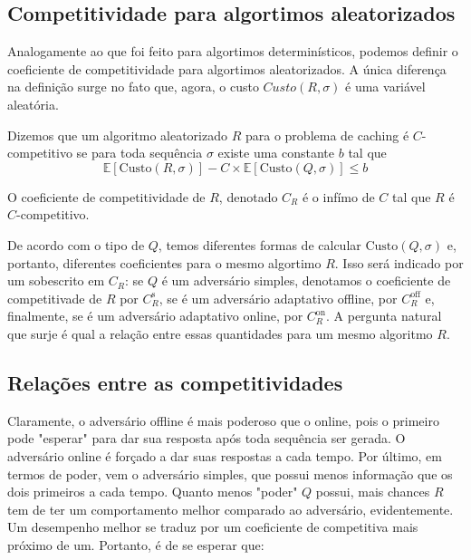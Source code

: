 \subsection{Competitividade para algortimos aleatorizados}

Analogamente ao que foi feito para algortimos determinísticos, podemos definir o coeficiente de competitividade para algortimos aleatorizados. A única diferença na definição surge no fato que, agora, o custo \(Custo(R, \sigma)\) é uma variável aleatória.

\begin{definition}
  Dizemos que um algoritmo aleatorizado \(R\) para o problema de caching é \(C\)-competitivo se para toda sequência \(\sigma\) existe uma constante \(b\) tal que
  \begin{equation}
    \mathbb{E}[\text{Custo}(R, \sigma)] - C \times \mathbb{E}[\text{Custo}(Q, \sigma)] \leqslant b
  \end{equation}
  
\end{definition}

O coeficiente de competitividade de \(R\), denotado \(C_R\) é o infímo de \(C\) tal que \(R\) é \(C\)-competitivo.

De acordo com o tipo de \(Q\), temos diferentes formas de calcular \(\text{Custo}(Q, \sigma)\) e, portanto, diferentes coeficientes para o mesmo algortimo \(R\). Isso será indicado por um sobescrito em \(C_R\): se \(Q\) é um adversário simples, denotamos o coeficiente de competitivade de \(R\) por \(C_R^{\text{s}}\), se é um adversário adaptativo offline, por \(C_R^{\text{off}}\) e, finalmente, se é um adversário adaptativo online, por \(C_R^{\text{on}}\). A pergunta natural que surje é qual a relação entre essas quantidades para um mesmo algoritmo \(R\).

\subsection{Relações entre as competitividades}

Claramente, o adversário offline é mais poderoso que o online, pois o primeiro pode "esperar" para dar sua resposta após toda sequência ser gerada. O adversário online é forçado a dar suas respostas a cada tempo. Por último, em termos de poder, vem o adversário simples, que possui menos informação que os dois primeiros a cada tempo. Quanto menos "poder" \(Q\) possui, mais chances \(R\) tem de ter um comportamento melhor comparado ao adversário, evidentemente. Um desempenho melhor se traduz por um coeficiente de competitiva mais próximo de um. Portanto, é de se esperar que:

